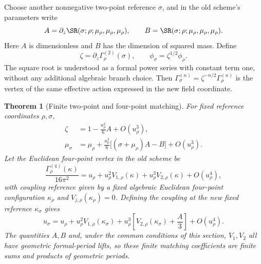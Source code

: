 \documentclass[11pt,a4paper,oneside]{article}
\theoremstyle{plain}
\newtheorem{theorem}{Theorem}[section]
\theoremstyle{definition}
\theoremstyle{remark}
\numberwithin{equation}{section}
\begin{document}
Choose another nonnegative two-point reference $\sigma$, and in the old scheme's parameters write
\begin{equation}\label{sunsetjet:eq:AB}
 A=\partial_z\SR(\sigma;\rho;\mu_\rho,\mu_\rho,\mu_\rho),\qquad
 B=\SR(\sigma;\rho;\mu_\rho,\mu_\rho,\mu_\rho).
\end{equation}
Here $A$ is dimensionless and $B$ has the dimension of squared mass.
Define
\[
 \zeta=\partial_z\Gamma^{(2)}_\rho(\sigma),\qquad
 \phi_\sigma=\zeta^{1/2}\phi_\rho.
\]
The square root is understood as a formal power series with constant term one, without any additional algebraic branch choice.
Then $\Gamma^{(n)}_\sigma=\zeta^{-n/2}\Gamma^{(n)}_\rho$
is the vertex of the same effective action expressed in the new field coordinate.

\begin{theorem}[Finite two-point and four-point matching]\label{sunsetjet:thm:matching}
For fixed reference coordinates $\rho,\sigma$,
\begin{align}
 \zeta&=1-\frac{u_\rho^2}{6}A+O(u_\rho^3),\label{sunsetjet:eq:zeta}\\
 \mu_\sigma&=\mu_\rho+
       \frac{u_\rho^2}{6}\bigl[(\sigma+\mu_\rho)A-B\bigr]
       +O(u_\rho^3).\label{sunsetjet:eq:mass}
\end{align}
Let the Euclidean four-point vertex in the old scheme be
\begin{equation}\label{sunsetjet:eq:vertex}
 \frac{\Gamma^{(4)}_\rho(\kappa)}{16\pi^2}
   =u_\rho+u_\rho^2V_{1,\rho}(\kappa)
            +u_\rho^3V_{2,\rho}(\kappa)+O(u_\rho^4),
\end{equation}
with coupling reference given by a fixed algebraic Euclidean four-point configuration $\kappa_\rho$ and
$V_{j,\rho}(\kappa_\rho)=0$.
Defining the coupling at the new fixed reference $\kappa_\sigma$ gives
\begin{equation}\label{sunsetjet:eq:coupling}
 u_\sigma=u_\rho+u_\rho^2V_{1,\rho}(\kappa_\sigma)
    +u_\rho^3\left[V_{2,\rho}(\kappa_\sigma)+\frac A3\right]
    +O(u_\rho^4).
\end{equation}
The quantities $A,B$ and, under the common conditions of this section, $V_1,V_2$ all have geometric formal-period lifts,
so these finite matching coefficients are finite sums and products of geometric periods.
\end{theorem}
\end{document}
